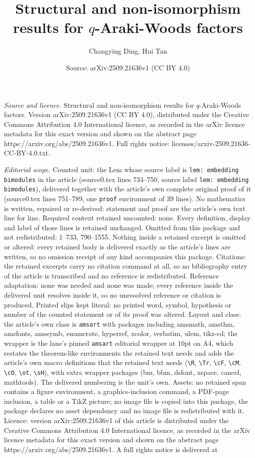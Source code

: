 \documentclass[10pt,a4paper]{amsart}
\title[Structural and non-isomorphism results for $q$-Araki-Woods f]{Structural and non-isomorphism results for $q$-Araki-Woods factors}
\author{Changying Ding, Hui Tan}
\date{Source: arXiv:2509.21636v1 (CC BY 4.0)}
\begin{document}
\maketitle

\noindent\emph{Source and licence.} Structural and non-isomorphism results for $q$-Araki-Woods factors. Version arXiv:2509.21636v1 (CC BY 4.0), distributed under the Creative Commons Attribution 4.0 International licence, as recorded in the arXiv licence metadata for this exact version and shown on the abstract page https://arxiv.org/abs/2509.21636v1. Full rights notice: licenses/arxiv-2509.21636-CC-BY-4.0.txt.\par\smallskip

\noindent\textit{Editorial scope.} Counted unit: the Lem whose source label is \texttt{lem: embedding bimodules} in the article (source0.tex lines 734--750, source label \texttt{lem: embedding bimodules}), delivered together with the article's own complete original proof of it (source0.tex lines 751--789, one \texttt{proof} environment of 39 lines). No mathematics is written, repaired or re-derived: statement and proof are the article's own text line for line. Required context retained uncounted: none. Every definition, display and label of those lines is retained unchanged. Omitted from this package and not redistributed: 1--733, 790--1555. Nothing inside a retained excerpt is omitted or altered: every retained body is delivered exactly as the article's lines are written, so no omission receipt of any kind accompanies this package. Citations: the retained excerpts carry no citation command at all, so no bibliography entry of the article is transcribed and no reference is redistributed. Reference adaptation: none was needed and none was made; every reference inside the delivered unit resolves inside it, so no unresolved reference or citation is produced. Printed slips kept literal: no printed word, symbol, hypothesis or number of the counted statement or of its proof was altered. Layout and class: the article's own class is \texttt{amsart} with packages including amsmath, amsthm, amsfonts, amssymb, enumerate, hyperref, xcolor, verbatim, ulem, tikz-cd; the wrapper is the lane's pinned \texttt{amsart} editorial wrapper at 10pt on A4, which restates the theorem-like environments the retained text needs and adds the article's own macro definitions that the retained text needs (\texttt{\textbackslash R}, \texttt{\textbackslash Tr}, \texttt{\textbackslash cF}, \texttt{\textbackslash cM}, \texttt{\textbackslash cO}, \texttt{\textbackslash ot}, \texttt{\textbackslash sH}), with extra wrapper packages (bm, bbm, dsfont, xspace, cancel, mathtools). The delivered numbering is the unit's own. Assets: no retained span contains a figure environment, a graphics-inclusion command, a PDF-page inclusion, a table or a TikZ picture; no image file is copied into this package, the package declares no asset dependency and no image file is redistributed with it. Licence: version arXiv:2509.21636v1 of this article is distributed under the Creative Commons Attribution 4.0 International licence, as recorded in the arXiv licence metadata for this exact version and shown on the abstract page https://arxiv.org/abs/2509.21636v1. A full rights notice is delivered at 
\end{document}
